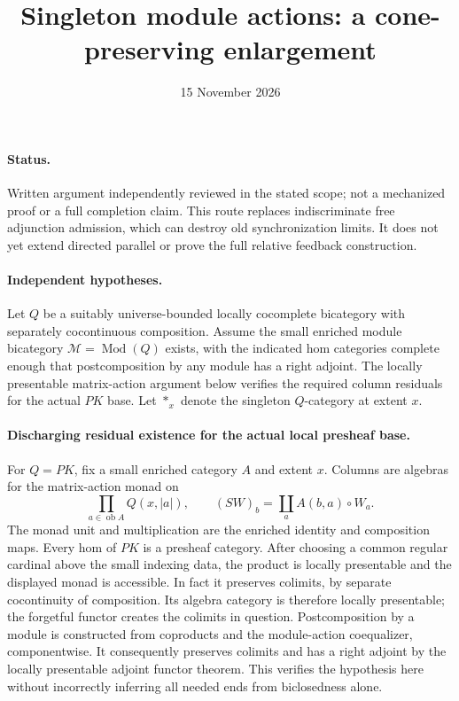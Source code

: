 \documentclass{article}
\title{Singleton module actions: a cone-preserving enlargement}
\date{15 November 2026}
\begin{document}
\maketitle
\paragraph{Status.} Written argument independently reviewed in the stated scope; not a mechanized proof or a full completion claim. This route replaces indiscriminate free adjunction admission, which can destroy old synchronization limits. It does not yet extend directed parallel or prove the full relative feedback construction.

\paragraph{Independent hypotheses.} Let $Q$ be a suitably universe-bounded locally cocomplete bicategory with separately cocontinuous composition. Assume the small enriched module bicategory $\mathcal M=\operatorname{Mod}(Q)$ exists, with the indicated hom categories complete enough that postcomposition by any module has a right adjoint. The locally presentable matrix-action argument below verifies the required column residuals for the actual $PK$ base. Let $*_x$ denote the singleton $Q$-category at extent $x$.

\paragraph{Discharging residual existence for the actual local presheaf base.} For $Q=PK$, fix a small enriched category $A$ and extent $x$. Columns are algebras for the matrix-action monad on
\[
 \prod_{a\in\operatorname{ob}A}Q(x,|a|),\qquad
 (S W)_b=\coprod_a A(b,a)\circ W_a.
\]
The monad unit and multiplication are the enriched identity and composition maps. Every hom of $PK$ is a presheaf category. After choosing a common regular cardinal above the small indexing data, the product is locally presentable and the displayed monad is accessible. In fact it preserves colimits, by separate cocontinuity of composition. Its algebra category is therefore locally presentable; the forgetful functor creates the colimits in question. Postcomposition by a module is constructed from coproducts and the module-action coequalizer, componentwise. It consequently preserves colimits and has a right adjoint by the locally presentable adjoint functor theorem. This verifies the hypothesis here without incorrectly inferring all needed ends from biclosedness alone.
\end{document}
